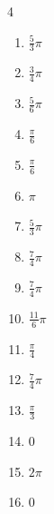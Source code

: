 \begin{multicols}{4}
\begin{enumerate}
  \item $\displaystyle \frac{5}{3}\pi$

  \item $\displaystyle \frac{3}{4}\pi$

  \item $\displaystyle \frac{5}{6}\pi$

  \item $\displaystyle \frac{\pi}{6}$

  \item $\displaystyle \frac{\pi}{6}$

  \item $\displaystyle \pi$

  \item $\displaystyle \frac{5}{3}\pi$

  \item $\displaystyle \frac{7}{4}\pi$

  \item $\displaystyle \frac{7}{4}\pi$

  \item $\displaystyle \frac{11}{6}\pi$

  \item $\displaystyle \frac{\pi}{4}$

  \item $\displaystyle \frac{7}{4}\pi$

\columnbreak %

\resetques

  \item $\displaystyle \frac{\pi}{3}$

  \item $\displaystyle 0$

  \item $\displaystyle 2\pi$

  \item $\displaystyle 0$


\end{enumerate}
\end{multicols}
